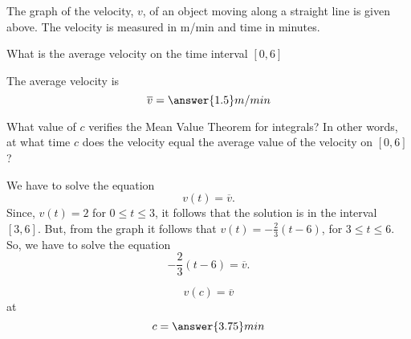 \documentclass{ximera}
\author{Steven Gubkin\and Nela Lakos}
\begin{document}
\begin{exercise}

\begin{image}
\end{image}

The  graph of the velocity, $v$, of an object moving along a straight line is given above.
The velocity is measured in m/min and time in minutes.

What is the average velocity on the time interval $[0,6]$
	\begin{prompt}
		The average velocity is 
		\[
		\overline{v}=\answer{1.5} m/min
		\]
	\end{prompt}

What value of $c$ verifies the Mean Value Theorem for integrals?  In other words, at what time $c$ does the velocity equal the average value of the velocity  on $[0,6]$?
\begin{hint}
We have to solve the equation
\[
		v(t)=\overline{v}.
		\]
		Since, $v(t)=2$ for $0\le t \le 3$, it follows that the solution is in the interval $[3,6]$.
		But, from the graph it follows that $v(t)=-\frac{2}{3}(t-6)$, for $3\le t \le 6$.
		So, we have to solve the equation
		\[
		-\frac{2}{3}(t-6)=\overline{v}.
		\]
\end{hint}
\[
	v(c)=\overline{v}
	\] 
	at
	\[
		c = \answer{3.75} min
		\]

\end{exercise}
\end{document}

